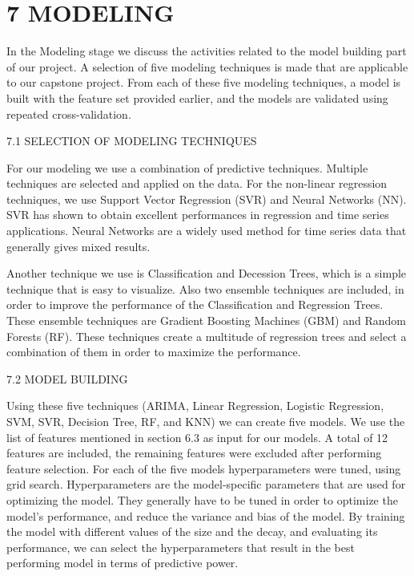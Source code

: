 \documentclass[11pt]{article}
\begin{document}
    \section{7 MODELING}\label{modeling}

In the Modeling stage we discuss the activities related to the model
building part of our project. A selection of five modeling techniques is
made that are applicable to our capstone project. From each of these
five modeling techniques, a model is built with the feature set provided
earlier, and the models are validated using repeated cross-validation.

7.1 SELECTION OF MODELING TECHNIQUES

For our modeling we use a combination of predictive techniques. Multiple
techniques are selected and applied on the data. For the non-linear
regression techniques, we use Support Vector Regression (SVR) and Neural
Networks (NN). SVR has shown to obtain excellent performances in
regression and time series applications. Neural Networks are a widely
used method for time series data that generally gives mixed results.

Another technique we use is Classification and Decession Trees, which is
a simple technique that is easy to visualize. Also two ensemble
techniques are included, in order to improve the performance of the
Classification and Regression Trees. These ensemble techniques are
Gradient Boosting Machines (GBM) and Random Forests (RF). These
techniques create a multitude of regression trees and select a
combination of them in order to maximize the performance.

7.2 MODEL BUILDING

Using these five techniques (ARIMA, Linear Regression, Logistic
Regression, SVM, SVR, Decision Tree, RF, and KNN) we can create five
models. We use the list of features mentioned in section 6.3 as input
for our models. A total of 12 features are included, the remaining
features were excluded after performing feature selection. For each of
the five models hyperparameters were tuned, using grid search.
Hyperparameters are the model-specific parameters that are used for
optimizing the model. They generally have to be tuned in order to
optimize the model's performance, and reduce the variance and bias of
the model. By training the model with different values of the size and
the decay, and evaluating its performance, we can select the
hyperparameters that result in the best performing model in terms of
predictive power.
\end{document}
